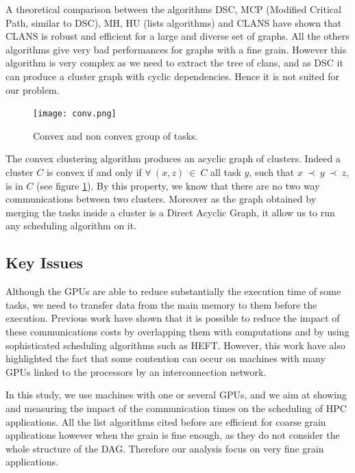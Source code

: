 \documentclass[10pt, conference, compsocconf,pdftex,dvipsnames]{IEEEtran}
\begin{document}
A theoretical comparison\cite{khan1994comparison} between the algorithms DSC,
MCP (Modified Critical Path, similar to DSC), MH, HU (lists algorithms) and
CLANS have shown that CLANS is robust and efficient for a large and diverse
set of graphs. All the others algorithms give very bad performances for graphs
with a fine grain. However this algorithm is very complex as we need to
extract the tree of clans, and as DSC it can produce a cluster graph with
cyclic dependencies. Hence it is not suited for our problem. 

\begin{figure}[htb]
    \centering
    \texttt{[image: conv.png]}
    \caption{Convex and non convex group of tasks.}
    \label{fig:conv}
\end{figure}


The convex clustering algorithm\cite{lepere2002new} produces an acyclic graph
of clusters.  Indeed a cluster $C$ is convex if and only if $\forall\ (x,z)\
\in\ C$ all task $y$, such that $x\ \prec\ y\ \prec\ z$, is in $C$ (see
figure \ref{fig:conv}). By this property, we know that there are no two way
communications between two clusters. Moreover as the graph obtained by merging
the tasks inside a cluster is a Direct Acyclic Graph, it allow us to run
any scheduling algorithm on it.

\subsection{Key Issues}

Although the GPUs are able to reduce substantially the execution time of some
tasks, we need to transfer data from the main memory to them before the
execution. Previous work\cite{ferreiralima:hal-00735470} have shown that it is
possible to reduce the impact of these communications costs by overlapping
them with computations and by using sophisticated scheduling algorithms such as
HEFT.  However, this work have also highlighted the fact that some contention
can occur on machines with many GPUs linked to the processors by an
interconnection network.

In this study, we use machines with one or several GPUs, and we aim at showing
and measuring the impact of the communication times on the scheduling of HPC
applications. All the list algorithms cited before are efficient for coarse
grain applications however when the grain is fine enough, as they do not
consider the whole structure of the DAG. Therefore our analysis focus on very
fine grain applications. 
\end{document}
